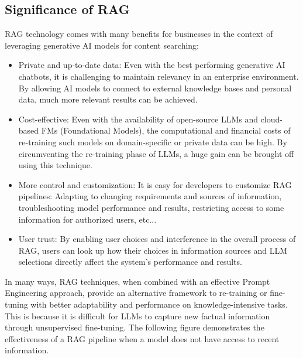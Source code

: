 \subsection{Significance of RAG}
RAG technology comes with many benefits for businesses in the context of leveraging generative AI models for content searching:
\begin{itemize}
    \item Private and up-to-date data: Even with the best performing generative AI chatbots, it is challenging to maintain relevancy in an enterprise environment. By allowing AI models to connect to external knowledge bases and personal data, much more relevant results can be achieved.
    \item Cost-effective: Even with the availability of open-source LLMs and cloud-based FMs (Foundational Models), the computational and financial costs of re-training such models on domain-specific or private data can be high. By circumventing the re-training phase of LLMs, a huge gain can be brought off using this technique.
    \item More control and customization: It is easy for developers to customize RAG pipelines: Adapting to changing requirements and sources of information, troubleshooting model performance and results, restricting access to some information for authorized users, etc...
    \item User trust: By enabling user choices and interference in the overall process of RAG, users can look up how their choices in information sources and LLM selections directly affect the system's performance and results.
\end{itemize}
In many ways, RAG techniques, when combined with an effective Prompt Engineering approach, provide an alternative framework to re-training or fine-tuning with better adaptability and performance on knowledge-intensive tasks. This is because it is difficult for LLMs to capture new factual information through unsupervised fine-tuning. The following figure demonstrates the effectiveness of a RAG pipeline when a model does not have access to recent information.
